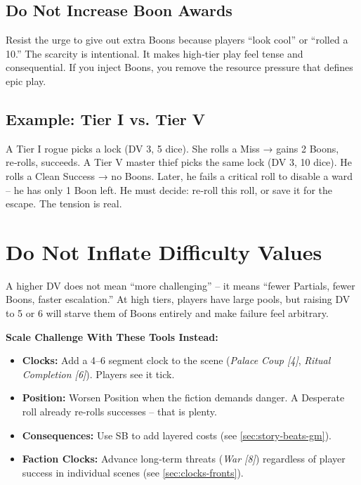 \subsection*{Do Not Increase Boon Awards}
Resist the urge to give out extra Boons because players “look cool” or “rolled a 10.” The scarcity is intentional. It makes high‑tier play feel tense and consequential. If you inject Boons, you remove the resource pressure that defines epic play.

\subsection*{Example: Tier I vs. Tier V}
A Tier I rogue picks a lock (DV 3, 5 dice). She rolls a Miss → gains 2 Boons, re‑rolls, succeeds.  
A Tier V master thief picks the same lock (DV 3, 10 dice). He rolls a Clean Success → no Boons. Later, he fails a critical roll to disable a ward – he has only 1 Boon left. He must decide: re‑roll this roll, or save it for the escape. The tension is real.

\section{Do Not Inflate Difficulty Values}

\begin{tcolorbox}[colback=red!5!white, colframe=red!75!black, title=⛔ Warning: DV Inflation Breaks High-Tier Play]
A higher DV does not mean “more challenging” – it means “fewer Partials, fewer Boons, faster escalation.” At high tiers, players have large pools, but raising DV to 5 or 6 will starve them of Boons entirely and make failure feel arbitrary.

\medskip
\noindent\textbf{Scale Challenge With These Tools Instead:}
\begin{itemize}
  \item \textbf{Clocks:} Add a 4–6 segment clock to the scene (\emph{Palace Coup [4]}, \emph{Ritual Completion [6]}). Players see it tick.
  \item \textbf{Position:} Worsen Position when the fiction demands danger. A Desperate roll already re‑rolls successes – that is plenty.
  \item \textbf{Consequences:} Use SB to add layered costs (see \ref{sec:story-beats-gm}).
  \item \textbf{Faction Clocks:} Advance long‑term threats (\emph{War [8]}) regardless of player success in individual scenes (see \ref{sec:clocks-fronts}).
\end{itemize}
\end{tcolorbox}

